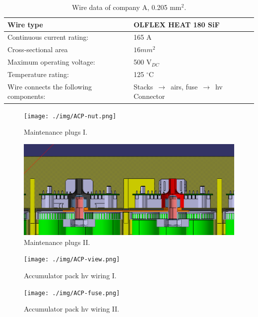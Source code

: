 \begin{table}[htbp]
	\centering
	\caption{Wire data of company A, 0.205 mm$^2$.}
	\begin{tabu}{|X|X|}\hline
		Wire type & OLFLEX HEAT 180 SiF \\\hline
		Continuous current rating: & 165 A \\\hline
		Cross-sectional area & $16mm^2$ \\\hline
		Maximum operating voltage: &  500 V$_{DC}$\\\hline
		Temperature rating: &  125 $^\circ$C\\\hline
		Wire connects the following components: & Stacks $\,\to\,$ \glspl{air}, fuse $\,\to\,$ \gls{hv} Connector \\\hline
	\end{tabu}%
	\label{tab:acc-wire}%
\end{table}%

\begin{figure}[H]
	\centering
	\texttt{[image: ./img/ACP-nut.png]}
	\caption{Maintenance plugs I.}
	\label{fig:acp-maintance-plug}
\end{figure}

\begin{figure}[H]
	\centering
	\includegraphics[width=\textwidth]{./img/ACP-nut2.png}
	\caption{Maintenance plugs II.}
	\label{fig:acp-maintance-plug2}
\end{figure}

\begin{figure}[H]
	\centering
	\texttt{[image: ./img/ACP-view.png]}
	\caption{Accumulator pack \gls{hv} wiring I.}
	\label{fig:acp-hv-wiring}
\end{figure}

\begin{figure}[H]
	\centering
	\texttt{[image: ./img/ACP-fuse.png]}
	\caption{Accumulator pack \gls{hv} wiring II.}
	\label{fig:acp-hv-wiring2}
\end{figure}

